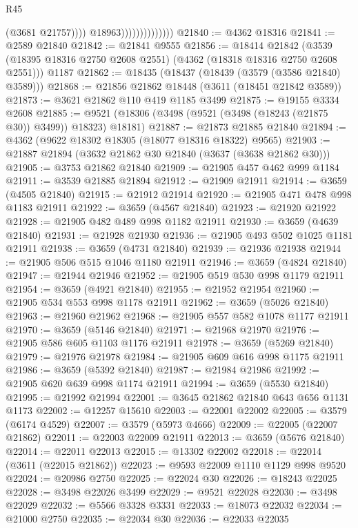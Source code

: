 \begin{lexlean}{R45}
\begin{coremodule}
                                      (@3681 @21757))))
                                @18963))))))))))))))
@21840 := @4362 @18316
@21841 := @2589 @21840
@21842 := @21841 @9555
@21856 := @18414
    @21842
    (@3539 (@18395 @18316 @2750 @2608 @2551) (@4362 (@18318 @18316 @2750 @2608 @2551)))
    @1187
@21862 := @18435 (@18437 (@18439 (@3579 (@3586 @21840) @3589)))
@21868 := @21856 @21862 @18448 (@3611 (@18451 @21842 @3589))
@21873 := @3621 @21862 @110 @419 @1185 @3499
@21875 := @19155 @3334 @2608
@21885 := @9521 (@18306 (@3498 (@9521 (@3498 (@18243 (@21875 @30)) @3499)) @18323) @18181)
@21887 := @21873 @21885 @21840
@21894 := @4362 (@9622 @18302 @18305 (@18077 @18316 @18322) @9565)
@21903 := @21887 @21894 (@3632 @21862 @30 @21840 (@3637 (@3638 @21862 @30)))
@21905 := @3753 @21862 @21840
@21909 := @21905 @457 @462 @999 @1184
@21911 := @3539 @21885 @21894
@21912 := @21909 @21911
@21914 := @3659 (@4505 @21840)
@21915 := @21912 @21914
@21920 := @21905 @471 @478 @998 @1183 @21911
@21922 := @3659 (@4567 @21840)
@21923 := @21920 @21922
@21928 := @21905 @482 @489 @998 @1182 @21911
@21930 := @3659 (@4639 @21840)
@21931 := @21928 @21930
@21936 := @21905 @493 @502 @1025 @1181 @21911
@21938 := @3659 (@4731 @21840)
@21939 := @21936 @21938
@21944 := @21905 @506 @515 @1046 @1180 @21911
@21946 := @3659 (@4824 @21840)
@21947 := @21944 @21946
@21952 := @21905 @519 @530 @998 @1179 @21911
@21954 := @3659 (@4921 @21840)
@21955 := @21952 @21954
@21960 := @21905 @534 @553 @998 @1178 @21911
@21962 := @3659 (@5026 @21840)
@21963 := @21960 @21962
@21968 := @21905 @557 @582 @1078 @1177 @21911
@21970 := @3659 (@5146 @21840)
@21971 := @21968 @21970
@21976 := @21905 @586 @605 @1103 @1176 @21911
@21978 := @3659 (@5269 @21840)
@21979 := @21976 @21978
@21984 := @21905 @609 @616 @998 @1175 @21911
@21986 := @3659 (@5392 @21840)
@21987 := @21984 @21986
@21992 := @21905 @620 @639 @998 @1174 @21911
@21994 := @3659 (@5530 @21840)
@21995 := @21992 @21994
@22001 := @3645 @21862 @21840 @643 @656 @1131 @1173
@22002 := @12257 @15610
@22003 := @22001 @22002
@22005 := @3579 (@6174 @4529)
@22007 := @3579 (@5973 @4666)
@22009 := @22005 (@22007 @21862)
@22011 := @22003 @22009 @21911
@22013 := @3659 (@5676 @21840)
@22014 := @22011 @22013
@22015 := @13302 @22002
@22018 := @22014 (@3611 (@22015 @21862))
@22023 := @9593 @22009 @1110 @1129 @998 @9520
@22024 := @20986 @2750
@22025 := @22024 @30
@22026 := @18243 @22025
@22028 := @3498 @22026 @3499
@22029 := @9521 @22028
@22030 := @3498 @22029
@22032 := @5566 @3328 @3331
@22033 := @18073 @22032
@22034 := @21000 @2750
@22035 := @22034 @30
@22036 := @22033 @22035

\end{coremodule}
\end{lexlean}
